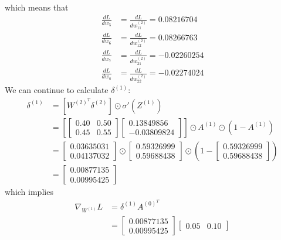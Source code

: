 \documentclass[a4paper, 12pt]{article}
\begin{document}
\begin{solution}
    which means that \begin{align*}
    \frac{dL}{dw_5} &= \frac{dL}{dw^{(2)}_{11}} =  0.08216704\\
        \frac{dL}{dw_6} &= \frac{dL}{dw^{(2)}_{12}} = 0.08266763\\
        \frac{dL}{dw_7} &= \frac{dL}{dw^{(2)}_{21}} = -0.02260254 \\
        \frac{dL}{dw_8} &= \frac{dL}{dw^{(2)}_{22}} = -0.02274024
    \end{align*}
    We can continue to calculate $\delta^{(1)}$:
    \begin{align*}
    \delta^{(1)} &= [W^{(2)^T} \delta^{(2)}] \odot \sigma'(Z^{(1)}) \\
    &= \left[\begin{bmatrix}
        0.40 & 0.50 \\
        0.45 & 0.55
    \end{bmatrix}
    \begin{bmatrix}
        0.13849856 \\
        -0.03809824
    \end{bmatrix}\right]  \odot A^{(1)} \odot (1-A^{(1)}) \\
    &= \begin{bmatrix}
        0.03635031 \\0.04137032
    \end{bmatrix}
    \odot \begin{bmatrix}
        0.59326999 \\ 0.59688438
        \end{bmatrix} \odot \left(1 - \begin{bmatrix}
            0.59326999 \\ 0.59688438
            \end{bmatrix}\right) \\
    &= \begin{bmatrix}
        0.00877135  \\
        0.00995425
    \end{bmatrix}
    \end{align*}
    which implies
    \begin{align*}
    \nabla_{W^{(1)}} L &= \delta^{(1)} A^{(0)^T} \\
    &= \begin{bmatrix}
        0.00877135  \\
        0.00995425
    \end{bmatrix}
    \begin{bmatrix}
    0.05 & 0.10
    \end{bmatrix} \\

\end{align*}
\end{solution}
\end{document}

